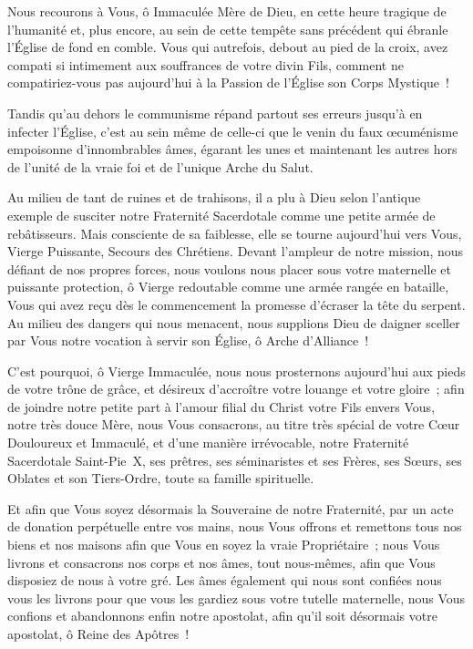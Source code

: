 \documentclass[%
a5paper%
,11pt%
,DIV=15%
,titlepage=on%
,headings=optiontoheadandtoc%
,headings=small%
,parskip=false%
,openany%
]{scrbook}
\begin{document}
\begin{multicols}{2}
Nous recourons à Vous, ô Immaculée Mère de Dieu, en cette heure tragique de l’humanité et, plus encore, au sein de cette tempête sans précédent qui ébranle l’Église de fond en comble. Vous qui autrefois, debout au pied de la croix, avez compati si intimement aux souffrances de votre divin Fils, comment ne compatiriez-vous pas aujourd’hui à la Passion de l’Église son Corps Mystique !

Tandis qu’au dehors le communisme répand partout ses erreurs jusqu’à en infecter l’Église, c’est au sein même de celle-ci que le venin du faux œcuménisme empoisonne d’innombrables âmes, égarant les unes et maintenant les autres hors de l’unité de la vraie foi et de l’unique Arche du Salut.

Au milieu de tant de ruines et de trahisons, il a plu à Dieu selon l’antique exemple de susciter notre Fraternité Sacerdotale comme une petite armée de rebâtisseurs. Mais consciente de sa faiblesse, elle se tourne aujourd’hui vers Vous, Vierge Puissante, Secours des Chrétiens. Devant l’ampleur de notre mission, nous défiant de nos propres forces, nous voulons nous placer sous votre maternelle et puissante protection, ô Vierge redoutable comme une armée rangée en bataille, Vous qui avez reçu dès le commencement la promesse d’écraser la tête du serpent. Au milieu des dangers qui nous menacent, nous supplions Dieu de daigner sceller par Vous notre vocation à servir son Église, ô Arche d’Alliance !

C’est pourquoi, ô Vierge Immaculée, nous nous prosternons aujourd’hui aux pieds de votre trône de grâce, et désireux d’accroître votre louange et votre gloire ; afin de joindre notre petite part à l’amour filial du Christ votre Fils envers Vous, notre très douce Mère, nous Vous consacrons, au titre très spécial de votre Cœur Douloureux et Immaculé, et d’une manière irrévocable, notre Fraternité Sacerdotale Saint-Pie X, ses prêtres, ses séminaristes et ses Frères, ses Sœurs, ses Oblates et son Tiers-Ordre, toute sa famille spirituelle.

Et afin que Vous soyez désormais la Souveraine de notre Fraternité, par un acte de donation perpétuelle entre vos mains, nous Vous offrons et remettons tous nos biens et nos maisons afin que Vous en soyez la vraie Propriétaire ; nous Vous livrons et consacrons nos corps et nos âmes, tout nous-mêmes, afin que Vous disposiez de nous à votre gré. Les âmes également qui nous sont confiées nous vous les livrons pour que vous les gardiez sous votre tutelle maternelle, nous Vous confions et abandonnons enfin notre apostolat, afin qu’il soit désormais votre apostolat, ô Reine des Apôtres !


\end{multicols}
\end{document}
